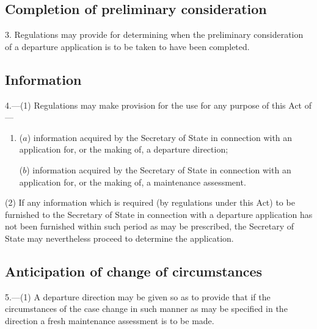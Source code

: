 \documentclass[12pt,a4paper]{article}
\begin{document}
{\subsection*{Completion of preliminary consideration}

3. Regulations may provide for determining when the preliminary consideration of a departure application is to be taken to have been completed.

\subsection*{Information}

4.—(1) Regulations may make provision for the use for any purpose of this Act of---
\begin{enumerate}\item[]
($a$) information acquired by the Secretary of State in connection with an
application for, or the making of, a departure direction;

($b$) information acquired by the Secretary of State in connection with
an application for, or the making of, a maintenance assessment.
\end{enumerate}

(2) If any information which is required (by regulations under this Act) to be furnished to the Secretary of State in connection with a departure application has not been furnished within such period as may be prescribed, the Secretary of State may nevertheless proceed to determine the application.


\subsection*{Anticipation of change of circumstances}

5.—(1) A departure direction may be given so as to provide that if the circumstances of the case change in such manner as may be specified in the direction a fresh maintenance assessment is to be made.

}
\end{document}
